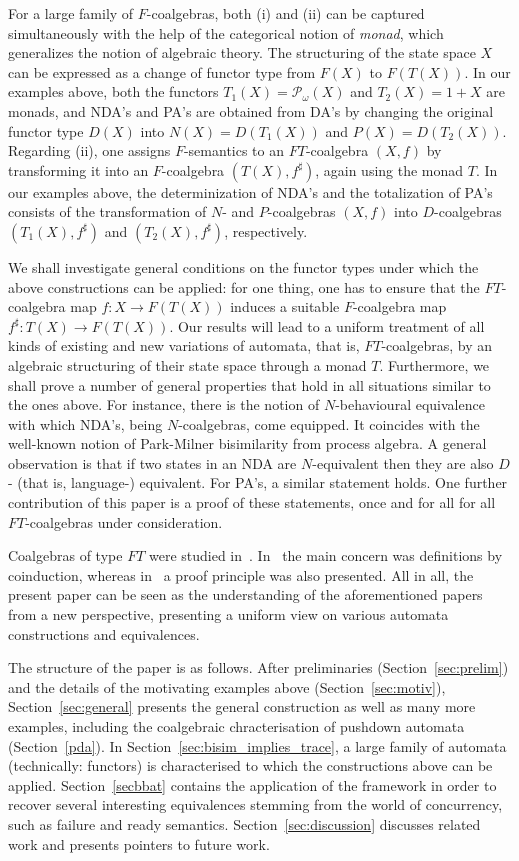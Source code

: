 \documentclass{LMCS}
\def\pow#1{{\mathcal P_\omega}#1}
\begin{document}
For a large family of $F$-coalgebras, both (i) and (ii) can be
captured simultaneously with the help of the categorical
notion of \emph{monad}, which generalizes the notion of algebraic theory.
The structuring of the state space $X$ can be expressed as a change of
functor type from $F(X)$ to $F(T(X))$. In our examples above, both the functors
$T_1(X) = \pow(X)$ and $T_2(X) = 1+X$ are monads,
and NDA's and PA's are obtained from DA's by changing the
original functor type $D(X)$ into $N(X) = D(T_1(X))$ and $P(X) = D(T_2(X))$.
Regarding (ii), one assigns $F$-semantics to an $FT$-coalgebra
$(X,f)$  by transforming it into an $F$-coalgebra $(T(X),f^\sharp)$,
again using the monad $T$. In our examples above,
the determinization of NDA's and the totalization of PA's
consists of the transformation of  $N$- and $P$-coalgebras
$(X,f)$ into $D$-coalgebras $(T_1(X), f^\sharp)$ and $(T_2(X), f^\sharp)$,
respectively.

We shall investigate general conditions on the functor types under
which the above constructions can be applied: for one thing, one has
to ensure that the  $FT$-coalgebra map $f\colon X \to F(T(X))$ induces a suitable
$F$-coalgebra map $f^\sharp \colon T(X) \to F(T(X)) $. 
Our results will lead to a uniform
treatment of all kinds of existing and new variations of automata,
that is, $FT$-coalgebras, by an algebraic structuring of their state
space through a monad $T$. Furthermore, we shall prove a number of
general properties that hold in all situations similar to the ones
above. For instance, there is the notion of $N$-behavioural
equivalence with which NDA's, being $N$-coalgebras, come equipped.
It coincides with the well-known notion of Park-Milner bisimilarity
from process algebra. A general observation is that if two states in
an NDA are $N$-equivalent then they are also $D$- (that is,
language-) equivalent. For PA's, a similar statement holds. One
further contribution of this paper is a proof of these statements,
once and for all for all $FT$-coalgebras under consideration.

Coalgebras of type $FT$ were studied in~\cite{Lenisa99,bartels,jacobs05}. In~\cite{bartels,jacobs05}
the main concern was definitions by coinduction, whereas in~\cite{Lenisa99} a proof principle was also presented.
 All in all, the present paper can be seen as the understanding of the aforementioned papers from a new perspective, presenting a uniform view on various automata constructions and equivalences.

The structure of the paper is as follows. After preliminaries
(Section~\ref{sec:prelim}) and
the details of the motivating examples above (Section~\ref{sec:motiv}),
Section~\ref{sec:general} presents the general construction
 as well as many more examples, including the coalgebraic chracterisation of pushdown automata (Section~\ref{pda}).
In Section~\ref{sec:bisim_implies_trace}, a large family of automata
(technically: functors) is characterised to which the constructions
above can be applied. Section~\ref{secbbat} contains the application of the framework in order to recover several 
interesting equivalences stemming from the world of concurrency, such as failure and ready semantics. 
Section~\ref{sec:discussion} discusses related work and presents pointers to future work.
\end{document}
